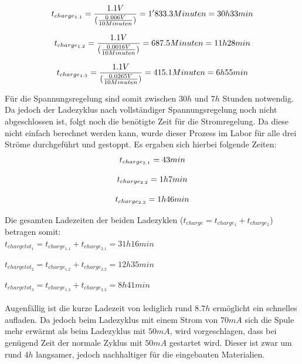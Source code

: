 \begin{equation}
\centering
t_{charge_{1.1}}=\frac{1.1 V}{(\frac{0.006 V}{10 Minuten})}=1'833.3 Minuten= 30h 33min
\label{eq:LadezeitSpannungsregelung1}
\end{equation}

\begin{equation}
\centering
t_{charge_{1.2}}=\frac{1.1 V}{(\frac{0.0016 V}{10 Minuten})}=687.5 Minuten= 11h 28min
\label{eq:LadezeitSpannungsregelung2}
\end{equation}

\begin{equation}
\centering
t_{charge_{1.3}}=\frac{1.1 V}{(\frac{0.0265 V}{10 Minuten})}=415.1 Minuten= 6h 55min
\label{eq:LadezeitSpannungsregelung3}
\end{equation}

Für die Spannungsregelung sind somit zwischen $30h$ und $7h$ Stunden notwendig. Da jedoch der Ladezyklus nach vollständiger Spannungsregelung noch nicht abgeschlossen ist, folgt noch die benötigte Zeit für die Stromregelung. Da diese nicht einfach berechnet werden kann, wurde dieser Prozess im Labor für alle drei Ströme durchgeführt und gestoppt. Es ergaben sich hierbei folgende Zeiten:
\begin{equation}
\centering
t_{charge_{2.1}}= 43min
\label{eq:LadezeitStromregelung1}
\end{equation}

\begin{equation}
\centering
t_{charge_{2.2}}= 1h 7min
\label{eq:LadezeitStromregelung2}
\end{equation}

\begin{equation}
\centering
t_{charge_{2.3}}= 1h 46min
\label{eq:LadezeitStromregelung3}
\end{equation}


Die gesamten Ladezeiten der beiden Ladezyklen ($t_{charge}=t_{charge_{1}}+t_{charge_{2}}$) betragen somit:\\

$t_{charge tot_{1}}=t_{charge_{1.1}}+t_{charge_{2.1}}=31h 16min$
 
$t_{charge tot_{2}}=t_{charge_{1.2}}+t_{charge_{2.2}}=12h 35min$
 
$t_{charge tot_{3}}=t_{charge_{1.3}}+t_{charge_{2.3}}=8h 41min$\\
\\
Augenfällig ist die kurze Ladezeit von lediglich rund $8.7h$ ermöglicht ein schnelles aufladen. Da jedoch beim Ladezyklus mit einem Strom von $70mA$ sich die Spule mehr erwärmt als beim Ladezyklus mit $50mA$, wird vorgeschlagen, dass bei genügend Zeit der normale Zyklus mit $50mA$ gestartet wird. Dieser ist zwar um rund $4h$ langsamer, jedoch nachhaltiger für die eingebauten Materialien.

